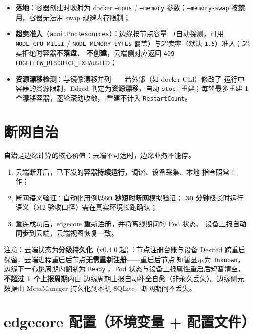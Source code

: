 \begin{itemize}
  \item \textbf{落地}：容器创建时映射为 docker \texttt{--cpus} /
        \texttt{--memory} 参数；\texttt{--memory-swap} 被\textbf{禁用}，容器无法用
        swap 规避内存限制；
  \item \textbf{超卖准入}（\texttt{admitPodResources}）：边缘按节点容量
        （自动探测，可用 \texttt{NODE\_CPU\_MILLI} / \texttt{NODE\_MEMORY\_BYTES}
        覆盖）与超卖率（默认 \texttt{1.5}）准入；超卖拒绝时容器\textbf{不落盘、
        不创建}，云端侧对应返回 \texttt{409 EDGEFLOW\_RESOURCE\_EXHAUSTED}；
  \item \textbf{资源漂移检测}：与镜像漂移并列——若外部（如 docker CLI）修改了
        运行中容器的资源限制，Edged 判定为\textbf{资源漂移}，自动
        \texttt{stop}+重建；每轮最多重建 \textbf{1 个}漂移容器，逐轮滚动收敛，
        重建不计入 \texttt{RestartCount}。
\end{itemize}

\section{断网自治}
\label{sec:5-autonomy}

\textbf{自治}是边缘计算的核心价值：云端不可达时，边缘业务不能停。

\begin{enumerate}
  \item 云端断开后，已下发的容器\textbf{持续运行}，调谐、设备采集、本地
        指令照常工作；
  \item 断网语义验证：自动化用例以\textbf{60 秒短时断网}模拟验证；
        \textbf{30 分钟}级长时运行语义（M2 验收口径）需在真实环境长跑确认；
  \item 重连成功后，edgecore 重新注册，并将离线期间的 Pod 状态、
        设备上报\textbf{自动同步}到云端，云端视图恢复一致。
\end{enumerate}

注意：云端状态为\textbf{分级持久化}（v0.4.0 起）：节点注册台账与设备
Desired 跨重启保留，云端进程重启后节点\textbf{无需重新注册}——重启后节点
短暂显示为 \texttt{Unknown}，边缘下一心跳周期内翻新为 \texttt{Ready}；
Pod 状态与设备上报属性重启后短暂清空，\textbf{不超过 1 个上报周期}内由
边缘周期上报自动补全自愈（非永久丢失）。边缘侧元数据由 MetaManager
持久化到本机 SQLite，断网期间不丢失。

\section{edgecore 配置（环境变量 + 配置文件）}

